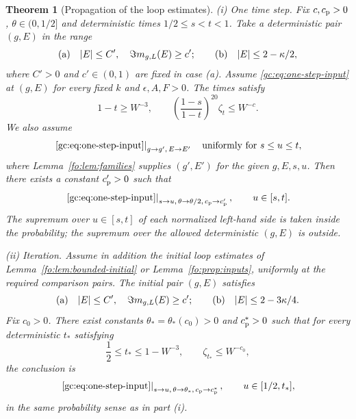\documentclass[11pt]{article}
\numberwithin{equation}{section}
\newtheorem{theorem}{Theorem}[section]
\theoremstyle{remark}
\begin{document}
\begin{theorem}[Propagation of the loop estimates]
\noindent\textup{(i) One time step.}
Fix $c,c_{\rm p}>0$, $\theta\in(0,1/2]$ and deterministic times
$1/2\le s<t<1$. Take a deterministic pair $(g,E)$ in the range
\begin{equation}\label{gc:eq:step-parameters}
 \textup{(a)}\quad |E|\le C',\quad \Im m_{g,L}(E)\ge c';
 \qquad \textup{(b)}\quad |E|\le2-\kappa/2,
\end{equation}
where $C'>0$ and $c'\in(0,1)$ are fixed in case \textup{(a)}.
Assume \eqref{gc:eq:one-step-input} at $(g,E)$ for every fixed $k$ and
$\epsilon,A,F>0$. The times satisfy
\begin{equation}\label{gc:eq:one-step}
 1-t\ge W^{-3},\qquad
 \left(\frac{1-s}{1-t}\right)^{20}\zeta_t\le W^{-c}.
\end{equation}
We also assume
\[
 \left.\eqref{gc:eq:one-step-input}\right|_{g\to g',\,E\to E'}
 \quad\text{uniformly for }s\le u\le t,
\]
where Lemma~\ref{fo:lem:families} supplies $(g',E')$ for the given
$g,E,s,u$.
Then there exists a constant $c_{\rm p}'>0$ such that
\begin{equation}\label{gc:eq:one-step-output}
 \left.\eqref{gc:eq:one-step-input}\right|_{
 s\to u,\,\theta\to\theta/2,\,c_{\rm p}\to c_{\rm p}'},
 \qquad u\in[s,t].
\end{equation}
The supremum over $u\in[s,t]$ of each
normalized left-hand side is taken inside the probability; the supremum
over the allowed deterministic $(g,E)$ is outside.

\medskip

\noindent\textup{(ii) Iteration.}
Assume in addition the initial loop estimates of
Lemma~\ref{fo:lem:bounded-initial} or Lemma~\ref{fo:prop:inputs},
uniformly at the required comparison pairs.
The initial pair $(g,E)$ satisfies
\begin{equation}\label{gc:eq:initial-parameters}
 \textup{(a)}\quad |E|\le C',\quad \Im m_{g,L}(E)\ge c';
 \qquad \textup{(b)}\quad |E|\le2-3\kappa/4.
\end{equation}
Fix $c_0>0$. There exist constants $\theta_*=\theta_*(c_0)>0$
and $c_{\rm p}^{*}>0$ such that for every deterministic $t_*$ satisfying
\begin{equation}\label{gc:eq:iteration-domain}
 \frac12\le t_*\le1-W^{-3},\qquad \zeta_{t_*}\le W^{-c_0},
\end{equation}
the conclusion is
\begin{equation}\label{gc:eq:iteration-output}
 \left.\eqref{gc:eq:one-step-input}\right|_{
 s\to u,\,\theta\to\theta_*,\,c_{\rm p}\to c_{\rm p}^{*}},
 \qquad u\in[1/2,t_*],
\end{equation}
in the same probability sense as in part (i).
\end{theorem}
\end{document}
